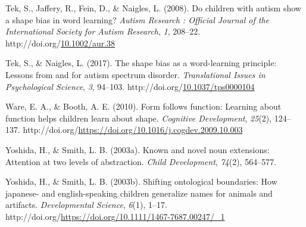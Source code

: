 \documentclass[10pt, letterpaper]{article}
\begin{document}
\begin{CSLReferences}{1}{0}
Tek, S., Jaffery, R., Fein, D., \& Naigles, L. (2008). Do children with
autism show a shape bias in word learning? \emph{Autism Research :
Official Journal of the International Society for Autism Research},
\emph{1}, 208--22.
http://doi.org/\href{https://doi.org/10.1002/aur.38}{10.1002/aur.38}

Tek, S., \& Naigles, L. (2017). The shape bias as a word-learning
principle: Lessons from and for autism spectrum disorder.
\emph{Translational Issues in Psychological Science}, \emph{3}, 94--103.
http://doi.org/\href{https://doi.org/10.1037/tps0000104}{10.1037/tps0000104}

Ware, E. A., \& Booth, A. E. (2010). Form follows function: Learning
about function helps children learn about shape. \emph{Cognitive
Development}, \emph{25}(2), 124--137.
http://doi.org/\url{https://doi.org/10.1016/j.cogdev.2009.10.003}

Yoshida, H., \& Smith, L. B. (2003a). Known and novel noun extensions:
Attention at two levels of abstraction. \emph{Child Development},
\emph{74}(2), 564--577.

Yoshida, H., \& Smith, L. B. (2003b). Shifting ontological boundaries:
How japanese- and english-speaking children generalize names for animals
and artifacts. \emph{Developmental Science}, \emph{6}(1), 1--17.
http://doi.org/\url{https://doi.org/10.1111/1467-7687.00247/_1}

\end{CSLReferences}


\end{document}
